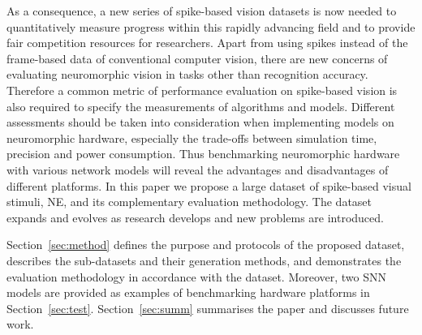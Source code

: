\documentclass{frontiersENG} %
\begin{document}
As a consequence, a new series of spike-based vision datasets is now needed to quantitatively measure progress within this rapidly advancing field and to provide fair competition resources for researchers.
Apart from using spikes instead of the frame-based data of conventional computer vision, there are new concerns of evaluating neuromorphic vision in tasks other than recognition accuracy.
Therefore a common metric of performance evaluation on spike-based vision is also required to specify the measurements of algorithms and models. 
Different assessments should be taken into consideration when implementing models on neuromorphic hardware, especially the trade-offs between simulation time, precision and power consumption.
Thus benchmarking neuromorphic hardware with various network models will reveal the advantages and disadvantages of different platforms.
In this paper we propose a large dataset of spike-based visual stimuli, NE, and its complementary evaluation methodology.
The dataset expands and evolves as research develops and new problems are introduced.

Section~\ref{sec:method} defines the purpose and protocols of the proposed dataset, describes the sub-datasets and their generation methods, and demonstrates the evaluation methodology in accordance with the dataset.
Moreover, two SNN models are provided as examples of benchmarking hardware platforms in Section~\ref{sec:test}.
Section~\ref{sec:summ} summarises the paper and discusses future work.
\end{document}
